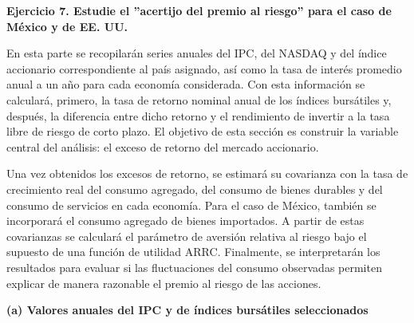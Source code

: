 \documentclass{article}\usepackage[]{graphicx}\usepackage[]{xcolor}
\begin{document}
\newpage
{\large\bfseries Ejercicio 7. Estudie el ''acertijo del premio al riesgo'' para el caso de México y de EE. UU.}
\vspace{0.2cm}

En esta parte se recopilarán series anuales del IPC, del NASDAQ y del índice accionario correspondiente al país asignado, así como la tasa de interés promedio anual a un año para cada economía considerada. Con esta información se calculará, primero, la tasa de retorno nominal anual de los índices bursátiles y, después, la diferencia entre dicho retorno y el rendimiento de invertir a la tasa libre de riesgo de corto plazo. El objetivo de esta sección es construir la variable central del análisis: el exceso de retorno del mercado accionario.

Una vez obtenidos los excesos de retorno, se estimará su covarianza con la tasa de crecimiento real del consumo agregado, del consumo de bienes durables y del consumo de servicios en cada economía. Para el caso de México, también se incorporará el consumo agregado de bienes importados. A partir de estas covarianzas se calculará el parámetro de aversión relativa al riesgo bajo el supuesto de una función de utilidad ARRC. Finalmente, se interpretarán los resultados para evaluar si las fluctuaciones del consumo observadas permiten explicar de manera razonable el premio al riesgo de las acciones.
\vspace{0.3cm}

\textbf{(a) Valores anuales del IPC y de índices bursátiles seleccionados}
\end{document}
